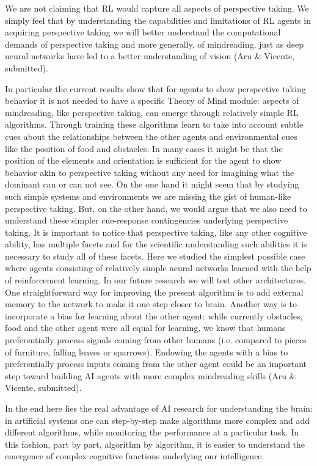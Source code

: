 \documentclass{article}
\begin{document}
We are not claiming that RL would capture all aspects of perspective taking. We simply feel that by understanding the capabilities and limitations of RL agents in acquiring perspective taking we will better understand the computational demands of perspective taking and more generally, of mindreading, just as deep neural networks have led to a better understanding of vision (Aru \& Vicente, submitted).

In particular the current results show that for agents to show perspective taking behavior it is not needed to have a specific Theory of Mind module: aspects of mindreading, like perspective taking, can emerge through relatively simple RL algorithms. Through training these algorithms learn to take into account subtle cues about the relationships between the other agents and environmental cues like the position of food and obstacles. In many cases it might be that the position of the elements and orientation is sufficient for the agent to show behavior akin to perspective taking without any need for imagining what the dominant can or can not see. On the one hand it might seem that by studying such simple systems and environments we are missing the gist of human-like perspective taking. But, on the other hand, we would argue that we also need to understand these simpler cue-response contingencies underlying perspective taking. It is important to notice that perspective taking, like any other cognitive ability, has multiple facets and for the scientific understanding such abilities it is necessary to study all of these facets. Here we studied the simplest possible case where agents consisting of relatively simple neural networks learned with the help of reinforcement learning. In our future research we will test other architectures. One straightforward way for improving the present algorithm is to add external memory to the network to make it one step closer to brain. Another way is to incorporate a bias for learning about the other agent: while currently obstacles, food and the other agent were all equal for learning, we know that humans preferentially process signals coming from other humans (i.e. compared to pieces of furniture, falling leaves or sparrows). Endowing the agents with a bias to preferentially process inputs coming from the other agent could be an important step toward building AI agents with more complex mindreading skills (Aru \& Vicente, submitted).

In the end here lies the real advantage of AI research for understanding the brain: in artificial systems one can step-by-step make algorithms more complex and add different algorithms, while monitoring the performance at a particular task. In this fashion, part by part, algorithm by algorithm, it is easier to understand the emergence of complex cognitive functions underlying our intelligence.


\appendix
\end{document}

